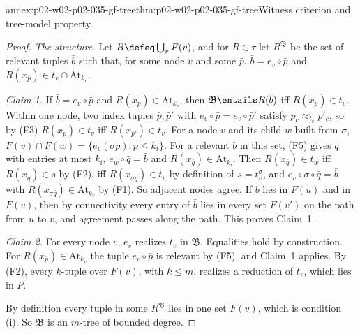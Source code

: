 \begin{annexitem}{annex:p02-w02-p02-035-gf-tree}{thm:p02-w02-p02-035-gf-tree}{Witness criterion and tree-model property}
\begin{proof}
\emph{The structure.}  Let \(B\defeq\bigcup_vF(v)\), and for \(R\in\tau\) let
\(R^{\mathfrak B}\) be the set of relevant tuples \(\bar b\) such that, for
some node \(v\) and some \(\bar p\), \(\bar b=e_v\circ\bar p\) and
\(R(x_{\bar p})\in t_v\cap\mathrm{At}_{k_v}\).

\emph{Claim 1.}  If \(\bar b=e_v\circ\bar p\) and
\(R(x_{\bar p})\in\mathrm{At}_{k_v}\), then \(\mathfrak B\entails R(\bar b)\)
iff \(R(x_{\bar p})\in t_v\).  Within one node, two index tuples
\(\bar p,\bar p'\) with \(e_v\circ\bar p=e_v\circ\bar p'\) satisfy
\(p_c\approx_{t_v}p'_c\), so by (F3) \(R(x_{\bar p})\in t_v\) iff
\(R(x_{\bar p'})\in t_v\).  For a node \(v\) and its child \(w\) built from
\(\sigma\), \(F(v)\cap F(w)=\{e_v(\sigma p):p\leq k_i\}\).  For a relevant
\(\bar b\) in this set, (F5) gives \(\bar q\) with entries at most \(k_i\),
\(e_w\circ\bar q=\bar b\) and \(R(x_{\bar q})\in\mathrm{At}_{k_i}\).  Then
\(R(x_{\bar q})\in t_w\) iff \(R(x_{\bar q})\in s\) by (F2), iff
\(R(x_{\sigma\bar q})\in t_v\) by definition of \(s=t_v^\sigma\), and
\(e_v\circ\sigma\circ\bar q=\bar b\) with \(R(x_{\sigma\bar q})\in\mathrm{At}_{k_v}\)
by (F1).  So adjacent nodes agree.  If \(\bar b\) lies in \(F(u)\) and in
\(F(v)\), then by connectivity every entry of \(\bar b\) lies in every set
\(F(v')\) on the path from \(u\) to \(v\), and agreement passes along the
path.  This proves Claim~1.

\emph{Claim 2.}  For every node \(v\), \(e_v\) realizes \(t_v\) in
\(\mathfrak B\).  Equalities hold by construction.  For
\(R(x_{\bar p})\in\mathrm{At}_{k_v}\) the tuple \(e_v\circ\bar p\) is relevant
by (F5), and Claim~1 applies.  By (F2), every \(k\)-tuple over \(F(v)\), with
\(k\leq m\), realizes a reduction of \(t_v\), which lies in \(P\).

By definition every tuple in some \(R^{\mathfrak B}\) lies in one set
\(F(v)\), which is condition (i).  So \(\mathfrak B\) is an \(m\)-tree of
bounded degree.


\end{proof}
\end{annexitem}
